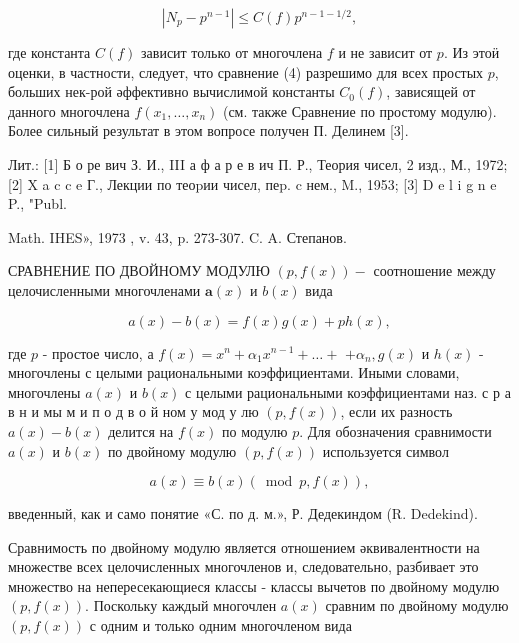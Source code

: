 \documentclass[10pt]{article}
\begin{document}
\[

\left|N_{p}-p^{n-1}\right| \leqslant C(f) p^{n-1-1 / 2},

\]



где константа $C(f)$ зависит только от многочлена $f$ и не зависит от $p$. Из этоӥ оценки, в частности, следует, что сравнение (4) разрешимо для всех простых $p$, больших нек-рой әффективно вычислимой константы $C_{0}(f)$, зависящей от данного многочлена $f\left(x_{1}, \ldots, x_{n}\right)$ (см. также Сравнение по простому модулю). Более сильный результат в этом вопросе получен П. Делинем [3].



Лит.: [1] Б о ре вич З. И., III а ф а р е в ич П. Р., Теория чисел, 2 изд., М., 1972; [2] X a c c e Г., Лекции по теоpии чисел, пеp. c нем., M., 1953; [3] D e l i g n e P., "Publ.

Math. IHES», 1973 , v. 43, p. 273-307. C. A. Степанов.



СРАВНЕНИЕ ПО ДВОЙНОМУ МОДУЛЮ $(p, f(x))-$ соотношение между целочисленными многочленами $\boldsymbol{a}(x)$ и $b(x)$ вида



\[

a(x)-b(x)=f(x) g(x)+p h(x),

\]



где $p$ - простое число, а $f(x)=x^{n}+\alpha_{1} x^{n-1}+\ldots+$ $+\alpha_{n}, g(x)$ и $h(x)$ - многочлены с целыми рациональными коэффициентами. Иными словами, многочлены $a(x)$ и $b(x)$ с целыми рациональными коэффициентами наз. с р а в н и мы м и п о д в о й ном у мод у лю $(p, f(x))$, если их разность $a(x)-b(x)$ делится на $f(x)$ по модулю $p$. Для обозначения сравнимости $a(x)$ и $b(x)$ по двойному модулю $(p, f(x))$ используется символ



\[

a(x) \equiv b(x)(\bmod p, f(x)),

\]



введенный, как и само понятие «С. по д. м.», Р. Дедекиндом (R. Dedekind).



Сравнимость по двойному модулю является отношением әквивалентности на множестве всех целочисленных многочленов и, следовательно, разбивает это множество на непересекающиеся классы - классы вычетов по двойному модулю $(p, f(x))$. Поскольку каждый многочлен $a(x)$ сравним по двойному модулю $(p, f(x))$ с одним и только одним многочленом вида
\end{document}
